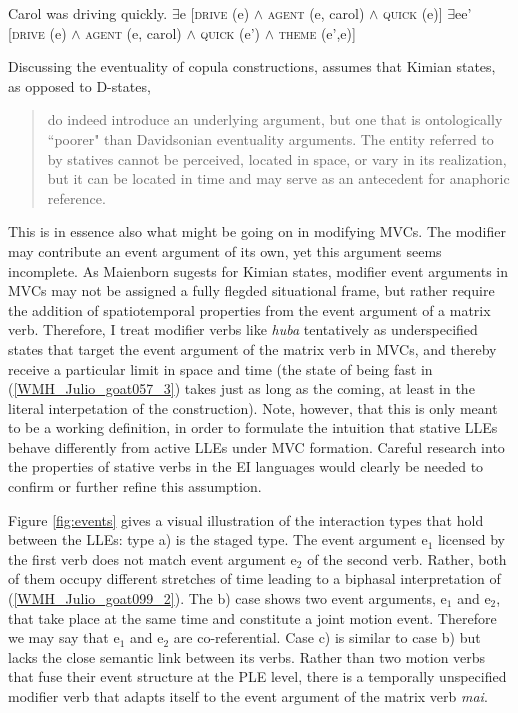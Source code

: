 \ea Carol was driving quickly.
\ea \label{carola} $\exists$e [\textsc{drive} (e) $\land$ \textsc{agent} (e, carol) $\land$ \textsc{quick} (e)]
\ex \label{carolb} $\exists$ee' [\textsc{drive} (e) $\land$ \textsc{agent} (e, carol) $\land$ \textsc{quick} (e') $\land$ \textsc{theme} (e',e)]
\z
\z

Discussing the eventuality of copula constructions, \citet[304]{maienborn2005limits} assumes that Kimian states, as opposed to D-states, 

\begin{quote}do indeed introduce an underlying argument, but one that is ontologically ``poorer" than Davidsonian eventuality arguments. The entity referred to by statives cannot be perceived, located in space, or vary in its realization, but it can be located in time and may serve as an antecedent for anaphoric reference.\end{quote}

This is in essence also what might be going on in modifying MVCs. The modifier may contribute an event argument of its own, yet this argument seems incomplete. As Maienborn sugests for Kimian states, modifier event arguments in MVCs may not be assigned a fully flegded situational frame, but rather require the addition of spatiotemporal properties from the event argument of a matrix verb. Therefore, I treat modifier verbs like \textit{huba} tentatively as underspecified states that target the event argument of the matrix verb in MVCs, and thereby receive a particular limit in space and time (the state of being fast in (\ref{WMH_Julio_goat057_3}) takes just as long as the coming, at least in the literal interpetation of the construction). Note, however, that this is only meant to be a working definition, in order to formulate the intuition that stative LLEs behave differently from active LLEs under MVC formation. Careful research into the properties of stative verbs in the EI languages would clearly be needed to confirm or further refine this assumption.

Figure \ref{fig:events} gives a visual illustration of the interaction types that hold between the LLEs: type a) is the staged type. The event argument e$_1$ licensed by the first verb does not match event argument e$_2$ of the second verb. Rather, both of them occupy different stretches of time leading to a biphasal interpretation of (\ref{WMH_Julio_goat099_2}). The b) case shows two event arguments, e$_1$ and e$_2$, that take place at the same time and constitute a joint motion event. Therefore we may say that e$_1$ and e$_2$ are co-referential. Case c) is similar to case b) but lacks the close semantic link between its verbs. Rather than two motion verbs that fuse their event structure at the PLE level, there is a temporally unspecified modifier verb that adapts itself to the event argument of the matrix verb \textit{mai}.

